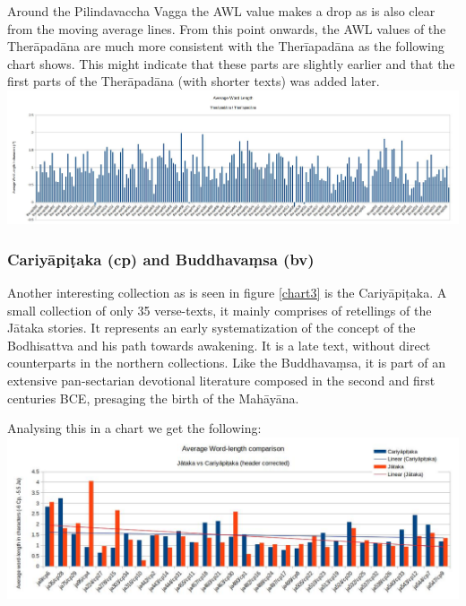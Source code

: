 \medskip
Around the Pilindavaccha Vagga the AWL value makes a drop as is also clear from the moving average lines. From this point onwards, the AWL values of the Therāpadāna are much more consistent with the Therīapadāna as the following chart shows. This might indicate that these parts are slightly earlier and that the first parts of the Therāpadāna (with shorter texts) was added later.\\

\includegraphics[width=\linewidth]{thaiap.jpg}
\label{thaiap}

\subsubsection{Cariyāpiṭaka (cp) and Buddhavaṃsa (bv)}
Another interesting collection as is seen in figure \ref{chart3} is the Cariyāpiṭaka. A small collection of only 35 verse-texts, it mainly comprises of retellings of the Jātaka stories. It represents an early systematization of the concept of the Bodhisattva and his path towards awakening. It is a late text, without direct counterparts in the northern collections. Like the Buddhavaṃsa, it is part of an extensive pan-sectarian devotional literature composed in the second and first centuries BCE, presaging the birth of the Mahāyāna.

Analysing this in a chart we get the following:\\

\includegraphics[width=\linewidth]{jacp.jpg}
\label{jacp}

